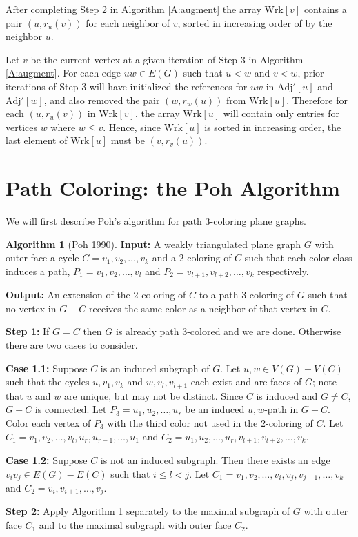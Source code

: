 \documentclass[12pt,letterpaper]{article}
\theoremstyle{plain}
\theoremstyle{definition}
\theoremstyle{break}
\newtheorem{algorithm}[lemma]{Algorithm}     %
\begin{document}
After completing Step $2$ in Algorithm \ref{A:augment} the array $\text{Wrk}[v]$ contains
a pair $(u,r_u(v))$ for each neighbor of $v$, sorted in increasing order of by
the neighbor $u$.

Let $v$ be the current vertex at a given iteration of Step $3$ in
Algorithm \ref{A:augment}. For each edge $uw\in E(G)$ such that
$u<w$ and $v<w$, prior iterations of Step 3 will have initialized the
references for $uw$ in $\text{Adj}'[u]$ and $\text{Adj}'[w]$, and also removed the pair
$(w,r_w(u))$ from $\text{Wrk}[u]$. Therefore for each $(u,r_u(v))$ in
$\text{Wrk}[v]$, the array $\text{Wrk}[u]$ will contain only entries for
vertices $w$ where $w\le v$. Hence, since $\text{Wrk}[u]$ is sorted in
increasing order, the last element of $\text{Wrk}[u]$ must be $(v,r_v(u))$.

\section{Path Coloring: the Poh Algorithm}

We will first describe Poh's algorithm for path $3$-coloring plane graphs.

\begin{algorithm}[Poh 1990] \label{A:planar3}
\textbf{Input:} A weakly triangulated plane graph $G$ with outer face a
cycle $C=v_1,v_2,\ldots, v_k$ and a $2$-coloring of $C$ such
that each color class induces a path, $P_1=v_1,v_2,\ldots, v_l$ and
$P_2=v_{l+1},v_{l+2},\ldots, v_k$ respectively.

\noindent\textbf{Output:} An extension of the $2$-coloring of $C$ to a path
$3$-coloring of $G$ such that no vertex in $G-C$ receives the same color as a
neighbor of that vertex in $C$.

\noindent\textbf{Step 1:} If $G=C$ then $G$ is already path $3$-colored and we
are done. Otherwise there are two cases to consider.

\noindent\textbf{Case 1.1:} Suppose $C$ is an induced subgraph of $G$. Let
$u,w\in V(G)-V(C)$ such that the cycles $u,v_1,v_k$ and $w,v_l,v_{l+1}$ each
exist and are faces of $G$; note that
$u$ and $w$ are unique, but may not be distinct. Since $C$ is induced and
$G\ne C$, $G-C$ is connected.
Let $P_3=u_1,u_2,\ldots,u_r$ be an induced $u,w$-path in $G-C$.
Color each vertex of $P_3$ with the third color not used in the $2$-coloring of
$C$. Let $C_1=v_1,v_2,\ldots,v_l,u_r,u_{r-1},\ldots,u_1$ and
$C_2=u_1,u_2,\ldots,u_r,v_{l+1},v_{l+2},\ldots,v_k$.

\noindent\textbf{Case 1.2:} Suppose $C$ is not an induced subgraph. Then there
exists an edge $v_iv_j\in E(G)-E(C)$ such that $i\le l < j$. Let
$C_1=v_1,v_2,\ldots,v_i,v_j,v_{j+1},\ldots,v_k$
and $C_2=v_i,v_{i+1},\ldots,v_j$.

\noindent\textbf{Step 2:} Apply Algorithm \ref{A:planar3} separately to the
maximal subgraph of $G$ with outer face $C_1$ and to the maximal subgraph with outer face
$C_2$.
\end{algorithm}
\end{document}
